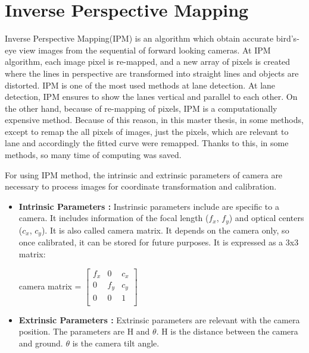 %
\section{Inverse Perspective Mapping}\label{sec:Inverse Perspective Mapping}
%
Inverse Perspective Mapping(IPM) is an algorithm which obtain accurate bird's-eye view images from the sequential 
of forward looking cameras. At IPM algorithm, each image pixel is re-mapped, and a new array of pixels is created 
where the lines in perspective are transformed into straight lines and objects are distorted. IPM is one of the 
most used methods at lane detection. At lane detection, IPM ensures to show the lanes vertical and parallel to 
each other. On the other hand, because of re-mapping of pixels, IPM is a computationally expensive method. Because 
of this reason, in this master thesis, in some methods, except to remap the all pixels of images, just the pixels,
which are relevant to lane and accordingly the fitted curve were remapped. Thanks to this, in some methods, so many 
time of computing was saved.

For using IPM method, the intrinsic and extrinsic parameters of camera are necessary to process images for coordinate 
transformation and calibration. 

\begin{itemize}
 \item \textbf{Intrinsic Parameters :} Instrinsic parameters include are specific to a camera. It includes information
of the focal length ($f_x$, $f_y$) and optical centers ($c_x$, $c_y$). It is also called camera matrix. It depends on 
the camera only, so once calibrated, it can be stored for future purposes. It is expressed as a 3x3 matrix: 

 \begin{center}
  camera matrix =  $
 \begin{bmatrix} 
f_x & 0 & c_x \\
0 & f_y & c_y \\
0 & 0 & 1 \\
\end{bmatrix}
$  \end{center}

 \item \textbf{Extrinsic Parameters :} Extrinsic parameters are relevant with the camera position. The parameters are H 
 and $\theta$. H is the distance between the camera and ground. $\theta$ is the camera tilt angle. 
 
  \end{itemize}
  
